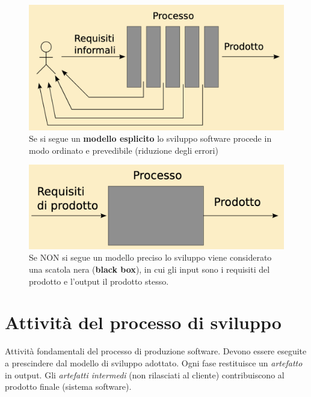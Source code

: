 \begin{figure}[ht!]
    \centering
    \includegraphics[width=0.8\linewidth]{assets/processo_esplicito.png}
    \caption{Se si segue un \textbf{modello esplicito} lo sviluppo software procede in modo ordinato e prevedibile (riduzione degli errori)}
\end{figure}

\begin{figure}[ht!]
    \centering
    \includegraphics[width=0.8\linewidth]{assets/processo_blackbox.png}
    \caption{Se NON si segue un modello preciso lo sviluppo viene considerato una scatola nera (\textbf{black box}), in cui gli input sono i requisiti del prodotto e l'output il prodotto stesso.}
\end{figure}

\newpage

\section{Attività del processo di sviluppo}
Attività fondamentali del processo di produzione software. Devono essere eseguite a prescindere dal modello di sviluppo adottato. Ogni fase restituisce un \textit{artefatto} in output. Gli \textit{artefatti intermedi} (non rilasciati al cliente) contribuiscono al prodotto finale (sistema software).

